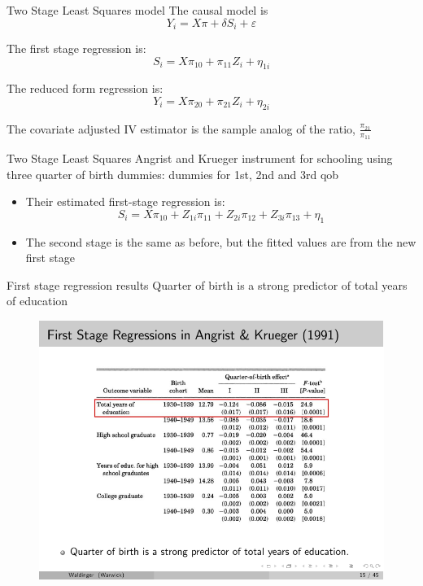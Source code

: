 \documentclass{beamer}
\begin{document}
\begin{frame}{Two Stage Least Squares model}
The causal model is $$Y_i = X \pi + \delta S_i + \varepsilon$$

The first stage regression is:$$S_i=X\pi_{10} + \pi_{11}Z_i + \eta_{1i}$$

The reduced form regression is:$$Y_i=X\pi_{20} + \pi_{21}Z_i+\eta_{2i}$$

The covariate adjusted IV estimator is the sample analog of the ratio, $\frac{\pi_{21}}{\pi_{11}}$
\end{frame}

\begin{frame}{Two Stage Least Squares}
  Angrist and Krueger instrument for schooling using three quarter of birth dummies: dummies for 1st, 2nd and 3rd qob
  \begin{itemize}
    \item Their estimated first-stage regression is:
    $$
    S_i=X\pi_{10} + Z_{1i}\pi_{11} + Z_{2i}\pi_{12} + Z_{3i}\pi_{13}+\eta_1
    $$

    \item The second stage is the same as before, but the fitted values are from the new first stage
  \end{itemize}

\end{frame}


\begin{frame}{First stage regression results}
  Quarter of birth is a strong predictor of total years of education

  \begin{figure}
    \includegraphics{./lecture_includes/qob_5.pdf}
  \end{figure}
\end{frame}
\end{document}
